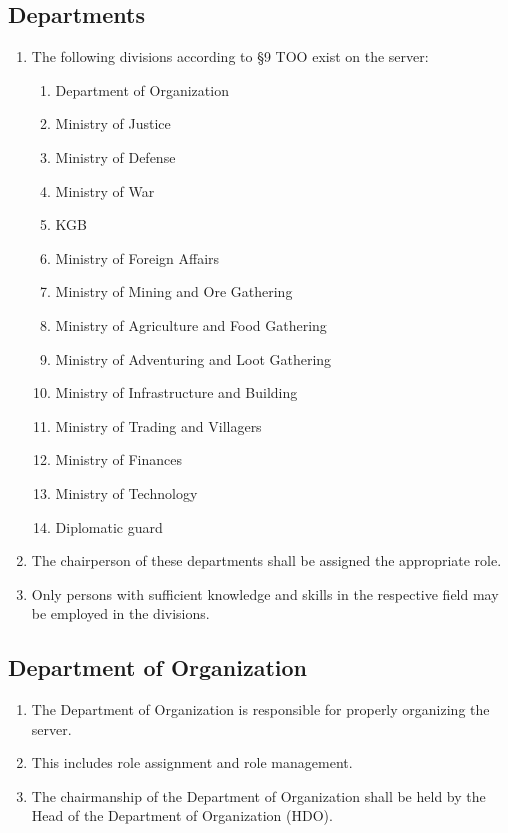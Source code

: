 \documentclass{article}
\begin{document}
\subsection{Departments}
\begin{enumerate}[(1)]
	\item The following divisions according to §9 TOO exist on the server:
		\begin{enumerate}[1.]
			\item Department of Organization
			\item Ministry of Justice
			\item Ministry of Defense
			\item Ministry of War
			\item KGB
			\item Ministry of Foreign Affairs
			\item Ministry of Mining and Ore Gathering
			\item Ministry of Agriculture and Food Gathering
			\item Ministry of Adventuring and Loot Gathering
			\item Ministry of Infrastructure and Building
			\item Ministry of Trading and Villagers
			\item Ministry of Finances
			\item Ministry of Technology
			\item Diplomatic guard
		\end{enumerate}
	\item The chairperson of these departments shall be assigned the appropriate role.
	\item Only persons with sufficient knowledge and skills in the respective field may be employed in the divisions.
\end{enumerate}

\subsection{Department of Organization}
\begin{enumerate}[(1)]
    \item The Department of Organization is responsible for properly organizing the server.
    \item This includes role assignment and role management.
    \item The chairmanship of the Department of Organization shall be held by the Head of the Department of Organization (HDO).
\end{enumerate}
\end{document}
